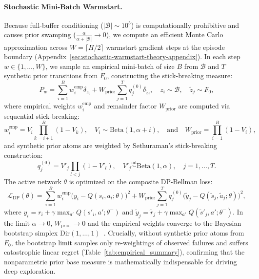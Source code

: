 \documentclass[10pt]{article}
\begin{document}
\paragraph{Stochastic Mini-Batch Warmstart.}
Because full-buffer conditioning ($|\mathcal{B}| \sim 10^5$) is computationally prohibitive and causes prior swamping ($\frac{\alpha}{\alpha + |\mathcal{B}|} \to 0$), we compute an efficient Monte Carlo approximation across $W = \lceil H / 2 \rceil$ warmstart gradient steps at the episode boundary (Appendix~\ref{sec:stochastic-warmstart-theory-appendix}). In each step $w \in \{1, \dots, W\}$, we sample an empirical mini-batch of size $B$ from $\mathcal{B}$ and $T$ synthetic prior transitions from $F_0$, constructing the stick-breaking measure:
\begin{equation}
\label{eq:stick_breaking_measure_warmstart}
P_w = \sum_{i=1}^B w_i^{\text{emp}} \delta_{z_i} + W_{\text{prior}} \sum_{j=1}^T q_j^{(0)} \delta_{\tilde{z}_j}, \quad z_i \sim \mathcal{B}, \quad \tilde{z}_j \sim F_0,
\end{equation}
where empirical weights $w_i^{\text{emp}}$ and remainder factor $W_{\text{prior}}$ are computed via sequential stick-breaking:
\begin{equation}
\label{eq:dp_stick_breaking_weights}
w_i^{\text{emp}} = V_i \prod_{k=i+1}^B (1 - V_k), \quad V_i \sim \mathrm{Beta}(1, \alpha + i), \quad \text{and} \quad W_{\text{prior}} = \prod_{i=1}^B (1 - V_i),
\end{equation}
and synthetic prior atoms are weighted by Sethuraman's stick-breaking construction:
\begin{equation}
\label{eq:prior_stick_breaking_weights}
q_j^{(0)} = V'_j \prod_{l < j} (1 - V'_l), \quad V'_j \stackrel{\text{iid}}{\sim} \mathrm{Beta}(1, \alpha), \quad j = 1, \dots, T.
\end{equation}
The active network $\theta$ is optimized on the composite DP-Bellman loss:
\begin{equation}
\label{eq:dp_bellman_loss}
\mathcal{L}_{\text{DP}}(\theta) = \sum_{i=1}^B w_i^{\text{emp}} \big(y_i - Q(s_i, a_i; \theta)\big)^2 + W_{\text{prior}} \sum_{j=1}^T q_j^{(0)} \big(\tilde{y}_j - Q(\tilde{s}_j, \tilde{a}_j; \theta)\big)^2,
\end{equation}
where $y_i = r_i + \gamma \max_{a'} Q(s'_i, a'; \theta^-)$ and $\tilde{y}_j = \tilde{r}_j + \gamma \max_{a'} Q(\tilde{s}'_j, a'; \theta^-)$. In the limit $\alpha \to 0$, $W_{\text{prior}} \to 0$ and the empirical weights converge to the Bayesian bootstrap simplex $\mathrm{Dir}(1, \dots, 1)$~\citep{rubin1981bayesian}. Crucially, without synthetic prior atoms from $F_0$, the bootstrap limit samples only re-weightings of observed failures and suffers catastrophic linear regret (Table~\ref{tab:empirical_summary}), confirming that the nonparametric prior base measure is mathematically indispensable for driving deep exploration.
\end{document}

